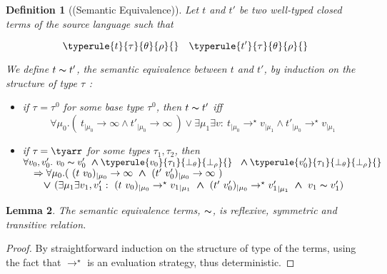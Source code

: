 \documentclass[a4paper,11pt,oneside]{article}
\theoremstyle{plain}
\newtheorem{definition}{Definition}[subsection]
\newtheorem{lemma}[definition]{Lemma}
\newcommand{\tmapp}[2]{(#1 ~ #2)}
\newcommand{\ty}[1][]{\tau_{#1}}
\newcommand{\bwedge}{\boldsymbol{\wedge}}
\newcommand{\bvee}{\boldsymbol{\vee}}
\newcommand{\evalstar}[4]{~#1_{|\mu_#2} \rightarrow^{\star} #3_{|\mu_#4} ~}
\newcommand{\evalinfty}[2]{~#1_{|#2} \rightarrow \infty ~}
\newcommand{\eqv}[1]{#1 \thicksim #1'}
\begin{document}
\label{semantic equivalence}
\begin{definition}[(Semantic Equivalence)]
	Let $t$ and $t'$ be two well-typed closed terms of the source 
	language such that 
	
	$$
		\typerule{t}{\tau}{\theta}{\rho}{} \quad \typerule{t'}{\tau}{\theta}{\rho}{} 
	$$

	We define $\eqv{t}$, the \textit{semantic equivalence} between $t$ and $t'$, 
	by induction on the structure of type $\ty$ :
	
	\begin{itemize}
		\item[$(\alpha)$]

			if $\ty{} = \ty{}^0$ for some base type $\ty{}^0$, then $\eqv{t}$ iff
			$$	\forall \mu_0.(\evalinfty{t}{\mu_0} \bwedge \evalinfty{t'}{\mu_0})~
					\bvee ~ \exists \mu_1 \exists v: 
					\evalstar{t}{0}{v}{1} \bwedge \evalstar{t'}{0}{v}{1} $$
		
		\item[$(\beta)$]
			if $\ty = \tyarr$ for some types $\ty[1], \ty[2]$,
			then\\[0.2cm]
			$\hspace*{0em}\forall v_0, v'_0. ~ \eqv{v_0} ~ 
			\bwedge \typerule{v_0}{\ty[1]}{\bot_\theta}{\bot_\rho}{} ~~
			\bwedge \typerule{v'_0}{\ty[1]}{\bot_\theta}{\bot_\rho}{} $ \\[0.2cm]
			$\hspace*{1em}
			\Rightarrow \forall\mu_0.(\evalinfty{\tmapp{t}{v_0}}{\mu_0}
			\bwedge\evalinfty{\tmapp{t'}{v'_0}}{\mu_0})$\\[0.2cm]
			$\hspace*{2em}\bvee~(\exists \mu_1 \exists v_1, v'_1 : 
			 	\evalstar{\tmapp{t}{v_0}}{0}{{v_1}}{1} 
				\bwedge \evalstar{\tmapp{t'}{v'_0}}{0}{{v'_1}}{1}
				\bwedge~\eqv{v_1})$				
	\end{itemize}
	\end{definition}


	\begin{lemma} 
		The semantic equivalence 	terms, $\thicksim$, is reflexive, 	
		symmetric and transitive relation.
	\end{lemma}
	
	\begin{proof}
		By straightforward induction on the structure of type of the terms, using 
		the fact that $\rightarrow^\star$ is an evaluation strategy, thus 
		deterministic.
	\end{proof}
\end{document}
